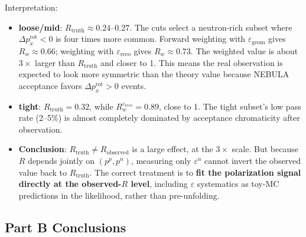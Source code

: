 \documentclass[a4paper,11pt]{article}
\begin{document}
Interpretation:
\begin{itemize}
    \item \textbf{loose/mid}: $R_\mathrm{truth}\approx 0.24$--$0.27$. The cuts
          select a neutron-rich subset where $\Delta p_x^\mathrm{rot}<0$ is
          four times more common. Forward weighting with
          $\varepsilon_\mathrm{geom}$ gives $R_w\approx 0.66$; weighting with
          $\varepsilon_\mathrm{reco}$ gives $R_w\approx 0.73$. The weighted
          value is about $3\times$ larger than $R_\mathrm{truth}$ and closer to
          1. This means the real observation is expected to look more symmetric
          than the theory value because NEBULA acceptance favors
          $\Delta p_x^\mathrm{rot}>0$ events.
    \item \textbf{tight}: $R_\mathrm{truth}=0.32$, while
          $R_w^{\varepsilon_\mathrm{reco}}=0.89$, close to 1. The tight subset's
          low pass rate (2--5\%) is almost completely dominated by acceptance
          chromaticity after observation.
    \item \textbf{Conclusion}: $R_\mathrm{truth}\neq R_\mathrm{observed}$ is a
          large effect, at the $3\times$ scale. But because $R$ depends jointly
          on $(p^p,p^n)$, measuring only $\varepsilon^n$ cannot invert the
          observed value back to $R_\mathrm{truth}$. The correct treatment is to
          \textbf{fit the polarization signal directly at the observed-$R$ level},
          including $\varepsilon$ systematics as toy-MC predictions in the
          likelihood, rather than pre-unfolding.
\end{itemize}

\subsection{Part B Conclusions}
\end{document}
